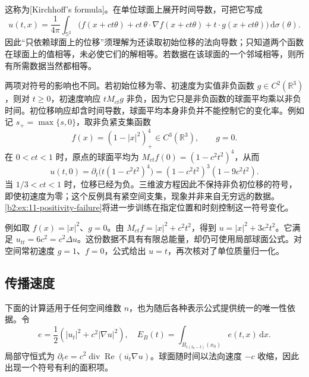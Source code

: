 这称为[Kirchhoff's formula]。在单位球面上展开时间导数，可把它写成
\[
 u(t,x)=\dfrac1{4\pi}\int_{\mathbb S^2}
 \bigl(f(x+ct\theta)+ct\,\theta\cdot\nabla f(x+ct\theta)
              +t\cdot g(x+ct\theta)\bigr)\,\mathrm{d}\sigma(\theta).
\]
因此“只依赖球面上的位移”须理解为还读取初始位移的法向导数；只知道两个函数在球面上的值相等，未必使它们的解相等。若数据在该球面的一个邻域相等，则所有所需数据当然都相等。

\ProseParagraphBreak

两项对符号的影响也不同。若初始位移为零、初速度为实值非负函数 \(g\in C^2(\mathbb R^3)\)，则对 \(t\geq0\)，初速度响应 \(tM_{ct}g\) 非负，因为它只是非负函数的球面平均乘以非负时间。初位移响应却含时间导数，球面平均本身非负并不能控制它的变化率。例如记 \(s_+=\max\{s,0\}\)，取非负紧支集函数
\[
 f(x)=(1-|x|^2)_+^4\in C^3(\mathbb R^3),\qquad g=0.
\]
在 \(0<ct<1\) 时，原点的球面平均为 \(M_{ct}f(0)=(1-c^2t^2)^4\)，从而
\[
 u(t,0)=\partial_t\bigl(t(1-c^2t^2)^4\bigr)
       =(1-c^2t^2)^3(1-9c^2t^2).
\]
当 \(1/3<ct<1\) 时，位移已经为负。三维波方程因此不保持非负初位移的符号，即使初速度为零；这个反例具有紧空间支集，现象并非来自无穷远的数据。\cref{b2:ex:11-positivity-failure}将进一步训练在指定位置和时刻控制这一符号变化。

\ProseParagraphBreak

例如取 \(f(x)=|x|^2\)、\(g=0\)。由 \(M_{ct}f=|x|^2+c^2t^2\)，得到 \(u=|x|^2+3c^2t^2\)。它满足 \(u_{tt}=6c^2=c^2\Delta u\)。这份数据不具有有限总能量，却仍可使用局部球面公式。对空间常初速度 \(g=1\)、\(f=0\)，公式给出 \(u=t\)，再次核对了单位质量归一化。

\subsection{传播速度}
\label{b2:subsec:110202}

下面的计算适用于任何空间维数 \(n\)，也为随后各种表示公式提供统一的唯一性依据。令
\[
 e=\dfrac12(|u_t|^2+c^2|\nabla u|^2),\quad
 E_B(t)=\int_{B_{c(t_0-t)}(x_0)}e(t,x)\,\mathrm{d}x.
\]
局部守恒式为 \(\partial_te=c^2\operatorname{div}\operatorname{Re}(\overline{u_t}\nabla u)\)。球面随时间以法向速度 \(-c\) 收缩，因此出现一个符号有利的面积项。

